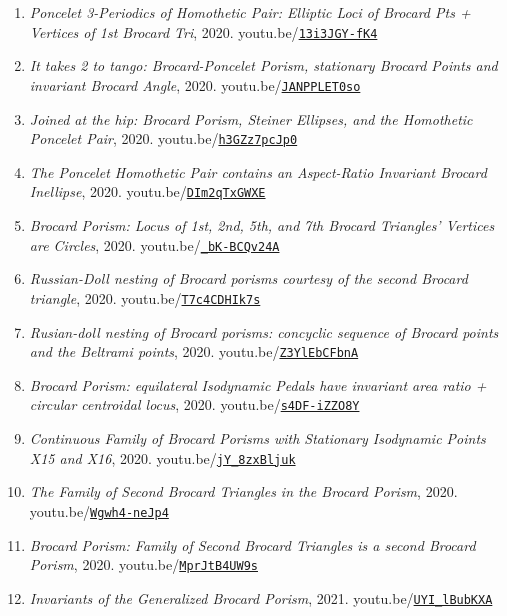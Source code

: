 \documentclass[12pt]{article}
\begin{document}
\begin{enumerate}[resume]
\item \textit{Poncelet 3-Periodics of Homothetic Pair: Elliptic Loci of Brocard Pts + Vertices of 1st Brocard Tri}, 2020. youtu.be/\href{https://youtu.be/13i3JGY-fK4}{\nolinkurl{13i3JGY-fK4}}
\item \textit{It takes 2 to tango: Brocard-Poncelet Porism, stationary Brocard Points and invariant Brocard Angle}, 2020. youtu.be/\href{https://youtu.be/JANPPLET0so}{\nolinkurl{JANPPLET0so}}
\item \textit{Joined at the hip: Brocard Porism, Steiner Ellipses, and the Homothetic Poncelet Pair}, 2020. youtu.be/\href{https://youtu.be/h3GZz7pcJp0}{\nolinkurl{h3GZz7pcJp0}}
\item \textit{The Poncelet Homothetic Pair contains an Aspect-Ratio Invariant Brocard Inellipse}, 2020. youtu.be/\href{https://youtu.be/DIm2qTxGWXE}{\nolinkurl{DIm2qTxGWXE}}
\item \textit{Brocard Porism: Locus of 1st, 2nd, 5th, and 7th Brocard Triangles' Vertices are Circles}, 2020. youtu.be/\href{https://youtu.be/_bK-BCQv24A}{\nolinkurl{\_bK-BCQv24A}}
\item \textit{Russian-Doll nesting of Brocard porisms courtesy of the second Brocard triangle}, 2020. youtu.be/\href{https://youtu.be/T7c4CDHIk7s}{\nolinkurl{T7c4CDHIk7s}}
\item \textit{Rusian-doll nesting of Brocard porisms: concyclic sequence of Brocard points and the Beltrami points}, 2020. youtu.be/\href{https://youtu.be/Z3YlEbCFbnA}{\nolinkurl{Z3YlEbCFbnA}}
\item \textit{Brocard Porism: equilateral Isodynamic Pedals have invariant area ratio + circular centroidal locus}, 2020. youtu.be/\href{https://youtu.be/s4DF-iZZO8Y}{\nolinkurl{s4DF-iZZO8Y}}
\item \textit{Continuous Family of Brocard Porisms with Stationary Isodynamic Points X15 and X16}, 2020. youtu.be/\href{https://youtu.be/jY_8zxBljuk}{\nolinkurl{jY\_8zxBljuk}}
\item \textit{The Family of Second Brocard Triangles in the Brocard Porism}, 2020. youtu.be/\href{https://youtu.be/Wgwh4-neJp4}{\nolinkurl{Wgwh4-neJp4}}
\item \textit{Brocard Porism: Family of Second Brocard Triangles is a second Brocard Porism}, 2020. youtu.be/\href{https://youtu.be/MprJtB4UW9s}{\nolinkurl{MprJtB4UW9s}}
\item \textit{Invariants of the Generalized Brocard Porism}, 2021. youtu.be/\href{https://youtu.be/UYI_lBubKXA}{\nolinkurl{UYI\_lBubKXA}}
\end{enumerate}
\end{document}
